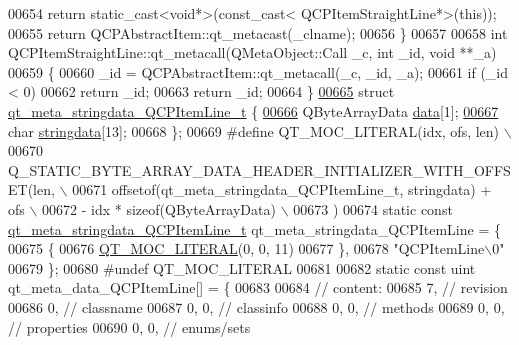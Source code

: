 \begin{DoxyCode}
00654         \textcolor{keywordflow}{return} \textcolor{keyword}{static\_cast<}\textcolor{keywordtype}{void}*\textcolor{keyword}{>}(\textcolor{keyword}{const\_cast<} QCPItemStraightLine*\textcolor{keyword}{>}(\textcolor{keyword}{this}));
00655     \textcolor{keywordflow}{return} QCPAbstractItem::qt\_metacast(\_clname);
00656 \}
00657 
00658 \textcolor{keywordtype}{int} QCPItemStraightLine::qt\_metacall(QMetaObject::Call \_c, \textcolor{keywordtype}{int} \_id, \textcolor{keywordtype}{void} **\_a)
00659 \{
00660     \_id = QCPAbstractItem::qt\_metacall(\_c, \_id, \_a);
00661     \textcolor{keywordflow}{if} (\_id < 0)
00662         \textcolor{keywordflow}{return} \_id;
00663     \textcolor{keywordflow}{return} \_id;
00664 \}
\hypertarget{a00016_source_l00665}{}\hyperlink{a00016}{00665} \textcolor{keyword}{struct }\hyperlink{a00016_d1/dd6/a00108}{qt\_meta\_stringdata\_QCPItemLine\_t} \{
\hypertarget{a00016_source_l00666}{}\hyperlink{a00016_a02b269c84618a73b8cefdb4c4ae888c6}{00666}     QByteArrayData \hyperlink{a00016_a02b269c84618a73b8cefdb4c4ae888c6}{data}[1];
\hypertarget{a00016_source_l00667}{}\hyperlink{a00016_ac705c65b9062c112f8ff0dd2a2915160}{00667}     \textcolor{keywordtype}{char} \hyperlink{a00016_ac705c65b9062c112f8ff0dd2a2915160}{stringdata}[13];
00668 \};
00669 \textcolor{preprocessor}{#define QT\_MOC\_LITERAL(idx, ofs, len) \(\backslash\)}
00670 \textcolor{preprocessor}{    Q\_STATIC\_BYTE\_ARRAY\_DATA\_HEADER\_INITIALIZER\_WITH\_OFFSET(len, \(\backslash\)}
00671 \textcolor{preprocessor}{    offsetof(qt\_meta\_stringdata\_QCPItemLine\_t, stringdata) + ofs \(\backslash\)}
00672 \textcolor{preprocessor}{        - idx * sizeof(QByteArrayData) \(\backslash\)}
00673 \textcolor{preprocessor}{    )}
00674 \textcolor{keyword}{static} \textcolor{keyword}{const} \hyperlink{a00016_d1/dd6/a00108}{qt\_meta\_stringdata\_QCPItemLine\_t} 
      qt\_meta\_stringdata\_QCPItemLine = \{
00675     \{
00676 \hyperlink{a00016_a75bb9482d242cde0a06c9dbdc6b83abe}{QT\_MOC\_LITERAL}(0, 0, 11)
00677     \},
00678     \textcolor{stringliteral}{"QCPItemLine\(\backslash\)0"}
00679 \};
00680 \textcolor{preprocessor}{#undef QT\_MOC\_LITERAL}
00681 
00682 \textcolor{keyword}{static} \textcolor{keyword}{const} uint qt\_meta\_data\_QCPItemLine[] = \{
00683 
00684  \textcolor{comment}{// content:}
00685        7,       \textcolor{comment}{// revision}
00686        0,       \textcolor{comment}{// classname}
00687        0,    0, \textcolor{comment}{// classinfo}
00688        0,    0, \textcolor{comment}{// methods}
00689        0,    0, \textcolor{comment}{// properties}
00690        0,    0, \textcolor{comment}{// enums/sets}

\end{DoxyCode}
